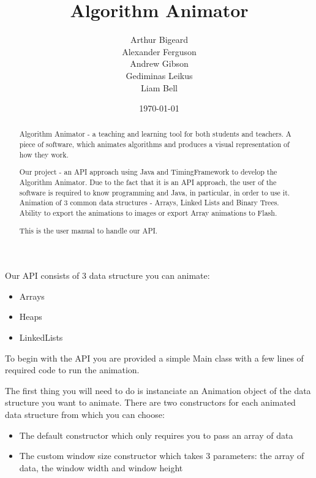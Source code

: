 \documentclass{l3proj}
\begin{document}
\title{Algorithm Animator}
\author{Arthur Bigeard \\
		Alexander Ferguson \\
		Andrew Gibson \\
		Gediminas Leikus \\
		Liam Bell}
\usdate
\date{\today}
\maketitle
\begin{abstract}

Algorithm Animator - a teaching and learning tool for both students and teachers. A piece of software, which animates algorithms and produces a visual representation of how they work.

Our project - an API approach using Java and TimingFramework to develop the Algorithm Animator. Due to the fact that it is an API approach, the user of the software is required to know programming and Java, in particular, in order to use it. Animation of 3 common data structures - Arrays, Linked Lists and Binary Trees. Ability to export the animations to images or export Array animations to Flash.

This is the user manual to handle our API.
\end{abstract}
\educationalconsent

Our API consists of 3 data structure you can animate:
\begin{itemize}
\item Arrays
\item Heaps
\item LinkedLists
\end{itemize}

To begin with the API you are provided a simple Main class with a few lines of required code to run the animation.



The first thing you will need to do is instanciate an Animation object of the data structure you want to animate. There are two constructors for
each animated data structure from which you can choose:
\begin{itemize}
\item The default constructor which only requires you to pass an array of data
\item The custom window size constructor which takes 3 parameters: the array of data, the window width and window height
\end{itemize}
\end{document}
